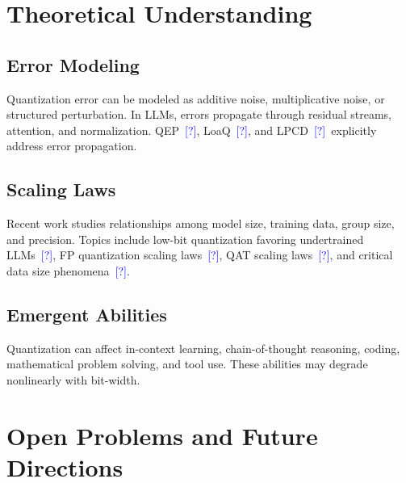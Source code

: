 \documentclass[journal,10pt]{IEEEtran}
\newcommand{\CITE}{\textcolor{blue}{[?]}}
\begin{document}
\section{Theoretical Understanding}

\subsection{Error Modeling}
Quantization error can be modeled as additive noise, multiplicative noise, or structured perturbation. In LLMs, errors propagate through residual streams, attention, and normalization. QEP~\CITE, LoaQ~\CITE, and LPCD~\CITE\ explicitly address error propagation.

\subsection{Scaling Laws}
Recent work studies relationships among model size, training data, group size, and precision. Topics include low-bit quantization favoring undertrained LLMs~\CITE, FP quantization scaling laws~\CITE, QAT scaling laws~\CITE, and critical data size phenomena~\CITE.

\subsection{Emergent Abilities}
Quantization can affect in-context learning, chain-of-thought reasoning, coding, mathematical problem solving, and tool use. These abilities may degrade nonlinearly with bit-width.

\section{Open Problems and Future Directions}
\end{document}
